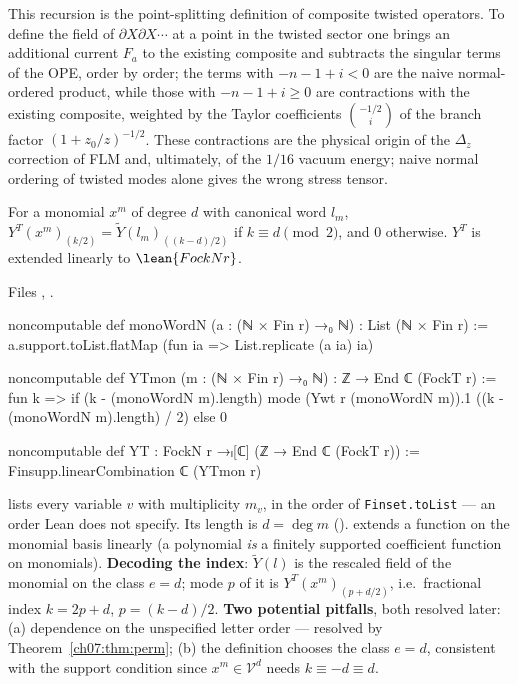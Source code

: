 \begin{physics}
This recursion is the point-splitting definition of composite twisted operators. To define the field of $\partial X\partial X\cdots$ at a point in the twisted sector one brings an additional current $F_a$ to the existing composite and subtracts the singular terms of the OPE, order by order; the terms with $-n-1+i<0$ are the naive normal-ordered product, while those with $-n-1+i\ge0$ are contractions with the existing composite, weighted by the Taylor coefficients $\binom{-1/2}{i}$ of the branch factor $(1+z_0/z)^{-1/2}$. These contractions are the physical origin of the $\Delta_z$ correction of FLM and, ultimately, of the $1/16$ vacuum energy; naive normal ordering of twisted modes alone gives the wrong stress tensor.
\end{physics}

\begin{definition}\label{ch07:def:YT}
For a monomial $x^m$ of degree $d$ with canonical word $l_m$,
$Y^T(x^m)_{(k/2)} = \widetilde Y(l_m)_{((k-d)/2)}$ if $k\equiv d\pmod2$, and $0$ otherwise.
$Y^T$ is extended linearly to $\lean{FockN r}$.
\end{definition}

\noindent Files , .
\begin{leancode}
noncomputable def monoWordN (a : (ℕ × Fin r) →₀ ℕ) : List (ℕ × Fin r) :=
  a.support.toList.flatMap (fun ia => List.replicate (a ia) ia)

noncomputable def YTmon (m : (ℕ × Fin r) →₀ ℕ) : ℤ → End ℂ (FockT r) := fun k =>
  if (k - (monoWordN m).length) %
    mode (Ywt r (monoWordN m)).1 ((k - (monoWordN m).length) / 2)
  else 0

noncomputable def YT : FockN r →ₗ[ℂ] (ℤ → End ℂ (FockT r)) :=
  Finsupp.linearCombination ℂ (YTmon r)
\end{leancode}

\begin{dictionary}
 lists every variable $v$ with multiplicity $m_v$, in the order of
\verb|Finset.toList| --- an order Lean does not specify. Its length is $d = \deg m$
().  extends a function on the monomial
basis linearly (a polynomial \emph{is} a finitely supported coefficient function on monomials).
\textbf{Decoding the index}: $\widetilde Y(l)$ is the rescaled field of the monomial on the class
$e = d$; mode $p$ of it is $Y^T(x^m)_{(p+d/2)}$, i.e.\ fractional index $k = 2p+d$, $p = (k-d)/2$.
\textbf{Two potential pitfalls}, both resolved later: (a) dependence on the unspecified letter
order --- resolved by Theorem~\ref{ch07:thm:perm}; (b) the definition chooses the class $e=d$,
consistent with the support condition since $x^m\in\mathcal V^d$ needs $k\equiv -d\equiv d$.
\end{dictionary}

